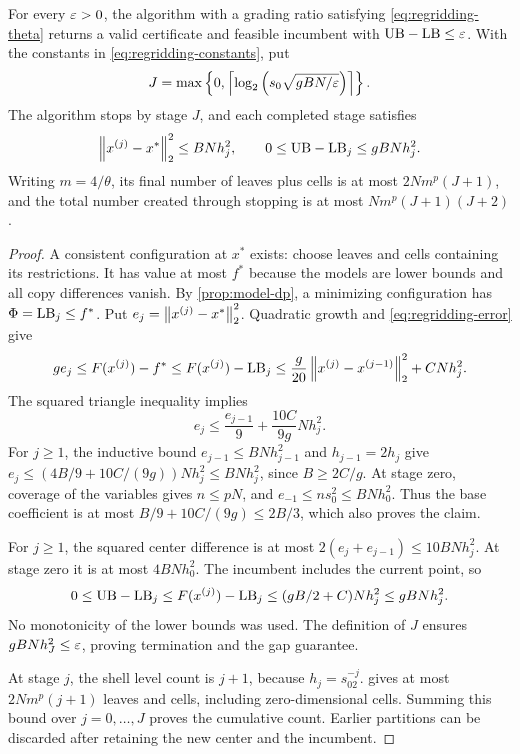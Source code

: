\begin{theorem}\label{thm:regridding-main}
For every $\varepsilon>0$, the algorithm with a grading ratio satisfying
\eqref{eq:regridding-theta} returns a valid certificate and feasible
incumbent with $\mathrm{UB}-\mathrm{LB}\le\varepsilon$. With the constants in
\eqref{eq:regridding-constants}, put
\begin{equation}\label{eq:regridding-horizon}
 J=\max\left\{0,\left\lceil \log_2\left(s_0\sqrt{gBN/\varepsilon}\right)\right\rceil\right\}.
\end{equation}
The algorithm stops by stage $J$, and each completed stage satisfies
\begin{equation}\label{eq:regridding-distance}
 \left\lVert x^{(j)}-x^*\right\rVert_2^2\le BNh_j^2,
 \qquad 0\le\mathrm{UB}-\mathrm{LB}_j\le gBNh_j^2.
\end{equation}
Writing $m=4/\theta$, its final number of leaves plus cells is at
most $2Nm^p(J+1)$, and the total number created through stopping is
at most $Nm^p(J+1)(J+2)$.
\end{theorem}

\begin{proof}
A consistent configuration at $x^*$ exists: choose leaves and cells
containing its restrictions. It has value at most $f^*$ because
the models are lower bounds and all copy differences vanish.
By \cref{prop:model-dp}, a minimizing configuration has
$\Phi=\mathrm{LB}_j\le f^*$. Put $e_j=\left\lVert x^{(j)}-x^*\right\rVert_2^2$.
Quadratic growth and \eqref{eq:regridding-error} give
\[
 ge_j\le F(x^{(j)})-f^*
 \le F(x^{(j)})-\mathrm{LB}_j
 \le\frac g{20}\left\lVert x^{(j)}-x^{(j-1)}\right\rVert_2^2+CNh_j^2.
\]
The squared triangle inequality implies
\begin{equation}\label{eq:regridding-contraction}
 e_j\le\frac{e_{j-1}}9+\frac{10C}{9g}Nh_j^2.
\end{equation}
For $j\ge1$, the inductive bound $e_{j-1}\le BNh_{j-1}^2$
and $h_{j-1}=2h_j$ give
$e_j\le(4B/9+10C/(9g))Nh_j^2\le BNh_j^2$, since $B\ge2C/g$.
At stage zero, coverage of the variables gives $n\le pN$, and
$e_{-1}\le ns_0^2\le BNh_0^2$. Thus the base coefficient is at
most $B/9+10C/(9g)\le2B/3$, which also proves the claim.

For $j\ge1$, the squared center difference is at most
$2(e_j+e_{j-1})\le10BNh_j^2$. At stage zero it is at most
$4BNh_0^2$. The incumbent includes the current point, so
\[
 0\le\mathrm{UB}-\mathrm{LB}_j\le F(x^{(j)})-\mathrm{LB}_j
 \le(gB/2+C)Nh_j^2\le gBNh_j^2.
\]
No monotonicity of the lower bounds was used. The definition of $J$
ensures $gBNh_J^2\le\varepsilon$, proving termination and the gap guarantee.

At stage $j$, the shell level count is $j+1$, because
$h_j=s_02^{-j}$.  gives at most
$2Nm^p(j+1)$ leaves and cells, including zero-dimensional cells.
Summing this bound over $j=0,\ldots,J$ proves the cumulative count.
Earlier partitions can be discarded after retaining the new center
and the incumbent.
\end{proof}

